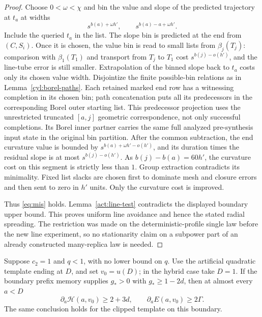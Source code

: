 \begin{proof}
Choose $0<\omega<\chi$ and bin the value and slope of the predicted
trajectory at $t_a$ at widths
\[
 s^{b(a)+\omega h'},\qquad s^{b(a)-a+\omega h'}.
\]
Include the queried $t_a$ in the list.  The slope bin is predicted
at the end from $(C,S_i)$.  Once it is chosen, the value bin is read
to small lists from $\beta_j(T_j)$: comparison with $\beta_1(T_1)$
and transport from $T_j$ to $T_1$ cost $s^{b(j)-o(h')}$, and the
line-tube error is still smaller.  Extrapolation of the binned slope
back to $t_a$ costs only its chosen value width.  Disjointize the
finite possible-bin relations as in Lemma~\ref{cyl:borel-paths}.
Each retained marked end row has a witnessing completion in its
chosen bin; path concatenation puts all its predecessors in the
corresponding Borel outer starting list. This predecessor projection
uses the unrestricted truncated \([a,j]\) geometric correspondence,
not only successful completions. Its Borel inner partner carries
the same full analyzed pre-synthesis input state in the original bin
partition.
After the common subtraction, the end curvature value is bounded
by $s^{b(a)+\omega h'-o(h')}$, and its duration times the residual
slope is at most $s^{b(j)-o(h')}$.  As $b(j)-b(a)=60h'$, the
curvature cost on this segment is strictly less than $1$.
Group extraction contradicts its minimality.  Fixed list slacks
are chosen first to dominate mesh and closure errors and then sent
to zero in $h'$ units.  Only the curvature cost is improved.

Thus \eqref{eq:mis} holds.  Lemma~\ref{act:line-test} contradicts
the displayed boundary upper bound.  This proves uniform line
avoidance and hence the stated radial spreading.  The restriction
was made on the deterministic-profile single law before the new
line experiment, so no stationarity claim on a subpower part of
an already constructed many-replica law is needed.
\end{proof}

\begin{proposition}\label{act:strict-boundary}
Suppose $c_2=1$ and $q<1$, with no lower bound on $q$.  Use the
artificial quadratic template ending at $D$, and set $v_0=u(D)$;
in the hybrid case take $D=1$.  If the boundary prefix memory
supplies $g_*>0$ with $g_*\ge1-2d$, then at almost every $a<D$
\[
 \partial_a\mathcal H(a,v_0)\ge2+3d,
 \qquad \partial_a E(a,v_0)\ge2\Gamma.
\]
The same conclusion holds for the clipped template on this boundary.
\end{proposition}

